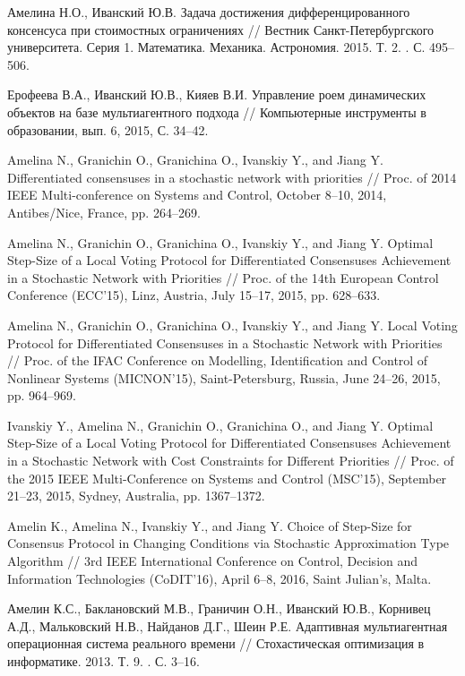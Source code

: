 \documentclass{spisok-article}
\newcommand*{\No}{\textnumero}
\begin{document}
\renewcommand\refname{Литература}
\begin{thebibliography}{11}

Амелина Н.О., Иванский Ю.В.
Задача достижения дифференцированного консенсуса при стоимостных ограничениях //
Вестник Санкт-Петербургского университета. Серия 1. Математика. Механика. Астрономия. 2015. Т. 2. \No 4. С. 495--506.

Ерофеева В.А., Иванский Ю.В., Кияев В.И.
Управление роем динамических объектов на базе мультиагентного подхода //
Компьютерные инструменты в образовании, вып. 6, 2015, С. 34--42.



Amelina N., Granichin O., Granichina O., Ivanskiy Y., and Jiang Y.
Differentiated consensuses in a stochastic network with priorities // 
Proc. of 2014 IEEE Multi-conference on Systems and Control, October 8--10, 2014, Antibes/Nice, France, pp. 264--269.

Amelina N., Granichin O., Granichina O., Ivanskiy Y., and Jiang Y.
Optimal Step-Size of a Local Voting Protocol for Differentiated Consensuses Achievement in a Stochastic Network with Priorities // Proc. of the 14th European Control Conference (ECC'15), Linz, Austria, July 15--17, 2015, pp. 628--633.

Amelina N., Granichin O., Granichina O., Ivanskiy Y., and Jiang Y.
Local Voting Protocol for Differentiated Consensuses in a Stochastic Network with Priorities  // Proc. of the IFAC Conference on Modelling, Identification and Control of Nonlinear Systems (MICNON'15), Saint-Petersburg, Russia, June 24--26, 2015, pp. 964--969.

Ivanskiy Y., Amelina N., Granichin O., Granichina O., and Jiang Y.
Optimal Step-Size of a Local Voting Protocol for Differentiated Consensuses Achievement in a Stochastic Network with Cost Constraints for Different Priorities // Proc. of the 2015 IEEE Multi-Conference on Systems and Control (MSC'15), September 21--23, 2015, Sydney, Australia, pp. 1367--1372.

Amelin K., Amelina N., Ivanskiy Y., and Jiang Y.
Choice of Step-Size for Consensus Protocol in Changing Conditions via Stochastic Approximation Type Algorithm // 3rd IEEE International Conference on Control, Decision and Information Technologies (CoDIT'16), April 6--8, 2016, Saint Julian's, Malta.


Амелин К.С., Баклановский М.В., Граничин О.Н., Иванский Ю.В., Корнивец А.Д., Мальковский Н.В., Найданов Д.Г., Шеин Р.Е. 
Адаптивная мультиагентная операционная система реального времени //
Стохастическая оптимизация в информатике. 2013. Т. 9. \No 1. С. 3--16.


\end{thebibliography}
\end{document}
